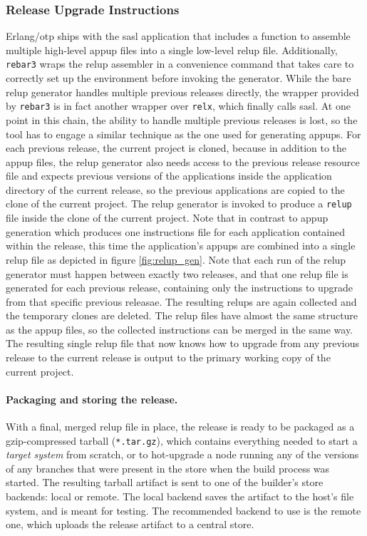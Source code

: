 {\subsubsection{Release Upgrade Instructions} Erlang/\acrshort{otp} ships with the \acrfull{sasl} application that includes a function to assemble multiple high-level \acrfull{appup} files into a single low-level \acrfull{relup} file. Additionally, \lstinline|rebar3| wraps the \acrshort{relup} assembler in a convenience command that takes care to correctly set up the environment before invoking the generator. While the bare \acrshort{relup} generator handles multiple previous releases directly, the wrapper provided by \lstinline|rebar3| is in fact another wrapper over \lstinline|relx|, which finally calls \acrshort{sasl}. At one point in this chain, the ability to handle multiple previous releases is lost, so the tool has to engage a similar technique as the one used for generating \acrshort{appup}s. For each previous release, the current project is cloned, because in addition to the \acrshort{appup} files, the \acrshort{relup} generator also needs access to the previous release resource file and expects previous versions of the applications inside the application directory of the current release, so the previous applications are copied to the clone of the current project. The \acrshort{relup} generator is invoked to produce a \lstinline|relup| file inside the clone of the current project. Note that in contrast to \acrshort{appup} generation which produces one instructions file for each application contained within the release, this time the application's \acrshort{appup}s are combined into a single \acrshort{relup} file as depicted in figure \ref{fig:relup_gen}. Note that each run of the \acrshort{relup} generator must happen between exactly two releases, and that one \acrshort{relup} file is generated for each previous release, containing only the instructions to upgrade from that specific previous releasae. The resulting \acrshort{relup}s are again collected and the temporary clones are deleted. The \acrshort{relup} files have almost the same structure as the \acrshort{appup} files, so the collected instructions can be merged in the same way. The resulting single \acrshort{relup} file that now knows how to upgrade from any previous release to the current release is output to the primary working copy of the current project.

\paragraph{Packaging and storing the release.} With a final, merged \acrshort{relup} file in place, the release is ready to be packaged as a gzip-compressed tarball (\lstinline|*.tar.gz|), which contains everything needed to start a \emph{target system} from scratch, or to hot-upgrade a node running any of the versions of any branches that were present in the store when the build process was started. The resulting tarball artifact is sent to one of the builder's store backends: local or remote. The local backend saves the artifact to the host's file system, and is meant for testing. The recommended backend to use is the remote one, which uploads the release artifact to a central store.

}
